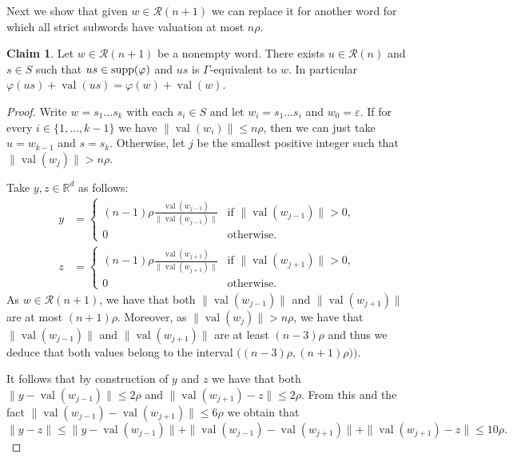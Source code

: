 \documentclass{article}
\theoremstyle{definition}
\newtheorem{claim}[theorem]{Claim} %
\theoremstyle{definition}
\newcommand{\RR}{\mathbb{R}}
\newcommand{\norm}[1]{\|{#1}\|}
\newcommand{\val}{\operatorname{val}}
\newcommand{\supp}{\textnormal{supp}}
\begin{document}
    Next we show that given $w \in \mathcal{R}(n+1)$ we can replace it for another word for which all strict subwords have valuation at most $n\rho$.

    \begin{claim}\label{claim:forma_canonica}
        Let $w\in \mathcal{R}(n+1)$ be a nonempty word. There exists $u \in \mathcal{R}(n)$ and $s \in S$ such that $us \in \supp(\varphi)$ and $us$ is $\Gamma$-equivalent to $w$. In particular $\varphi(us)+\val(us) = \varphi(w)+\val(w)$.
    \end{claim}

    \begin{proof}
        Write $w=s_1\dots s_k$ with each $s_i \in S$ and let $w_i = s_1\dots s_i$ and $w_0 = \varepsilon$. If for every $i\in \{1,\dots,k-1\}$ we have $\norm{\val(w_i)}\leq n\rho$, then we can just take $u = w_{k-1}$ and $s = s_k$. Otherwise, let $j$ be the smallest positive integer such that $\norm{\val(w_j)}>n \rho$.

        Take $y,z \in \RR^d$ as follows:
        \begin{align*}
            y & = \begin{cases}
            (n-1)\rho\frac{\val(w_{j-1})}{\norm{\val(w_{j-1})}} & \mbox{if } \norm{\val(w_{j-1})} > 0,\\
            0 & \mbox{otherwise}.
        \end{cases}\\
        z & = \begin{cases}
            (n-1)\rho\frac{\val(w_{j+1})}{\norm{\val(w_{j+1})}} & \mbox{if } \norm{\val(w_{j+1})} > 0,\\
            0 & \mbox{otherwise}.
        \end{cases} 
        \end{align*}
        As $w\in \mathcal{R}(n+1)$, we have that both $\norm{\val(w_{j-1})}$ and $\norm{\val(w_{j+1})}$ are at most $(n+1)\rho$. Moreover, as $\norm{\val(w_j)}>n \rho$, we have that $\norm{\val(w_{j-1})}$ and $\norm{\val(w_{j+1})}$ are at least $(n-3)\rho$ and thus we deduce that both values belong to the interval $\bigl( (n-3)\rho, (n+1)\rho)\bigr)$.
        
        It follows that by construction of $y$ and $z$ we have that both $\norm{y-\val(w_{j-1})} \leq 2\rho$ and $\norm{\val(w_{j+1})-z}\leq 2\rho$. From this and the fact $\norm{\val(w_{j-1})- \val(w_{j+1})}\leq 6\rho$ we obtain that
        \[ \norm{y-z} \leq \norm{y-\val(w_{j-1})} + \norm{\val(w_{j-1})- \val(w_{j+1})} + \norm{ \val(w_{j+1})-z} \leq 10\rho.   \]


\end{proof}
\end{document}
